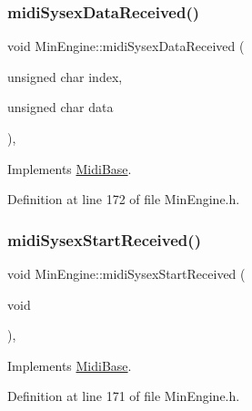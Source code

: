 \subsubsection{\texorpdfstring{midi\+Sysex\+Data\+Received()}{midiSysexDataReceived()}}
{\footnotesize\ttfamily void Min\+Engine\+::midi\+Sysex\+Data\+Received (\begin{DoxyParamCaption}\item[{unsigned char}]{index,  }\item[{unsigned char}]{data }\end{DoxyParamCaption})\hspace{0.3cm}{\ttfamily [inline]}, {\ttfamily [virtual]}}



Implements \hyperlink{class_midi_base_ade00871c0c9e32bfacf34480faf0d37b}{Midi\+Base}.



Definition at line 172 of file Min\+Engine.\+h.

\mbox{\label{class_min_engine_a79e4c141d7f6df522e5307195c8aeec0}} 
\subsubsection{\texorpdfstring{midi\+Sysex\+Start\+Received()}{midiSysexStartReceived()}}
{\footnotesize\ttfamily void Min\+Engine\+::midi\+Sysex\+Start\+Received (\begin{DoxyParamCaption}\item[{void}]{ }\end{DoxyParamCaption})\hspace{0.3cm}{\ttfamily [inline]}, {\ttfamily [virtual]}}



Implements \hyperlink{class_midi_base_a3b3e70e61a2f2fa169bf694eeefeb0fd}{Midi\+Base}.



Definition at line 171 of file Min\+Engine.\+h.

\mbox{\label{class_min_engine_a1378bc2f4ad5d072392a498f5ef9e8e8}} 
